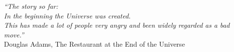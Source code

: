 \cleardoublepage
\thispagestyle{plain}

\vspace*{8cm}

\begin{flushright}
  \textsl{“The story so far:\\
In the beginning the Universe was created.\\
This has made a lot of people very angry and been widely regarded as a bad move.”}\\
\vspace*{1.5cm}
    Douglas Adams, The Restaurant at the End of the Universe
\end{flushright}
